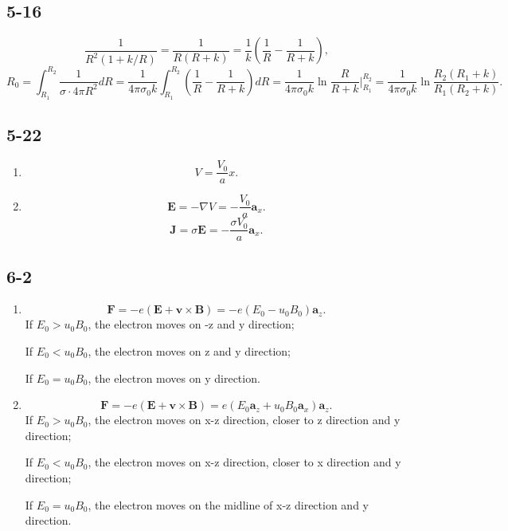 \documentclass[11pt,a4paper]{article}
\begin{document}
\subsection{5-16}
$$\frac{1}{R^2(1+k/R)}=\frac{1}{R(R+k)}=\frac{1}{k}\left(\frac{1}{R}-\frac{1}{R+k}\right),$$
$$R_0=\int_{R_1}^{R_2}\frac{1}{\sigma\cdot 4\pi R^2}dR=\frac{1}{4\pi\sigma_0k}\int_{R_1}^{R_2}\left(\frac{1}{R}-\frac{1}{R+k}\right)dR=\frac{1}{4\pi\sigma_0k}\ln\frac{R}{R+k}\bigg|_{R_1}^{R_2}=\frac{1}{4\pi\sigma_0k}\ln\frac{R_2(R_1+k)}{R_1(R_2+k)}.$$

\subsection{5-22}
\begin{enumerate}[label=\alph*)]
\item
$$V=\frac{V_0}{a}x.$$
\item
$$\mathbf{E}=-\nabla V=-\frac{V_0}{a}\mathbf{a}_x.$$
$$\mathbf{J}=\sigma \mathbf{E}=-\frac{\sigma V_0}{a}\mathbf{a}_x.$$
\end{enumerate}

\subsection{6-2}
\begin{enumerate}[label=\alph*)]
\item
$$\mathbf{F}=-e(\mathbf{E}+\mathbf{v}\times\mathbf{B})=-e(E_0-u_0B_0)\mathbf{a}_z.$$
If $E_0>u_0B_0$, the electron moves on -z and y direction;

If $E_0<u_0B_0$, the electron moves on z and y direction;

If $E_0=u_0B_0$, the electron moves on y direction.
\item
$$\mathbf{F}=-e(\mathbf{E}+\mathbf{v}\times\mathbf{B})=e(E_0\mathbf{a}_z+u_0B_0\mathbf{a}_x)\mathbf{a}_z.$$
If $E_0>u_0B_0$, the electron moves on x-z direction, closer to z direction and y direction;

If $E_0<u_0B_0$, the electron moves on x-z direction, closer to x direction and y direction;

If $E_0=u_0B_0$, the electron moves on the midline of x-z direction and y direction.
\end{enumerate}
\end{document}

